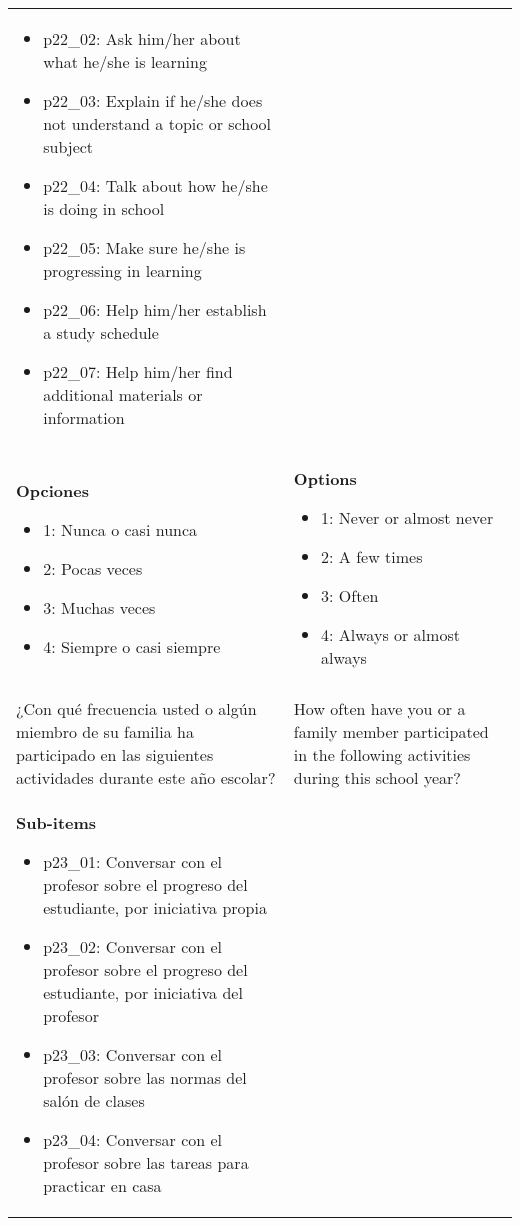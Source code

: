 \documentclass[11pt]{article}
\begin{document}
\begin{longtable}{@{}LL@{}}
\begin{itemize}[leftmargin=*]
\item p22\_02: Ask him/her about what he/she is learning
\item p22\_03: Explain if he/she does not understand a topic or school subject
\item p22\_04: Talk about how he/she is doing in school
\item p22\_05: Make sure he/she is progressing in learning
\item p22\_06: Help him/her establish a study schedule
\item p22\_07: Help him/her find additional materials or information\end{itemize} \\
\textbf{Opciones}\par\begin{itemize}[leftmargin=*]\item 1: Nunca o casi nunca
\item 2: Pocas veces
\item 3: Muchas veces
\item 4: Siempre o casi siempre\end{itemize} & \textbf{Options}\par\begin{itemize}[leftmargin=*]\item 1: Never or almost never
\item 2: A few times
\item 3: Often
\item 4: Always or almost always\end{itemize} \\
\addlinespace[4pt]
 \\ 
¿Con qué frecuencia usted o algún miembro de su familia ha participado en las siguientes actividades durante este año escolar? & How often have you or a family member participated in the following activities during this school year? \\
\textbf{Sub-items}\par\begin{itemize}[leftmargin=*]\item p23\_01: Conversar con el profesor sobre el progreso del estudiante, por iniciativa propia
\item p23\_02: Conversar con el profesor sobre el progreso del estudiante, por iniciativa del profesor
\item p23\_03: Conversar con el profesor sobre las normas del salón de clases
\item p23\_04: Conversar con el profesor sobre las tareas para practicar en casa

\end{itemize}
\end{longtable}
\end{document}
